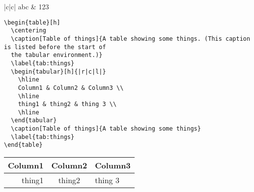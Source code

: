 \begin{table}
\begin{center}
\end{center}
\caption{Test table}
\label{tab:pdecay}
\end{table}


\begin{cdrtable}
  \begin{cdrtabu}{|c|c|}
    abc & 123 \\
  \end{cdrtabu}
  \label{tab:example}
\end{cdrtable}


\begin{verbatim}
\begin{table}[h]
  \centering
  \caption[Table of things]{A table showing some things. (This caption is listed before the start of
  the tabular environment.)}
  \label{tab:things}
  \begin{tabular}[h]{|r|c|l|}
    \hline
    Column1 & Column2 & Column3 \\
    \hline
    thing1 & thing2 & thing 3 \\
    \hline
  \end{tabular}
  \caption[Table of things]{A table showing some things}
  \label{tab:things}
\end{table}
\end{verbatim}
\begin{table}[h]
  \centering
  \begin{tabular}[h]{|r|c|l|}
    \hline
    Column1 & Column2 & Column3 \\
    \hline
    thing1 & thing2 & thing 3 \\
    \hline
  \end{tabular}
\end{table}

